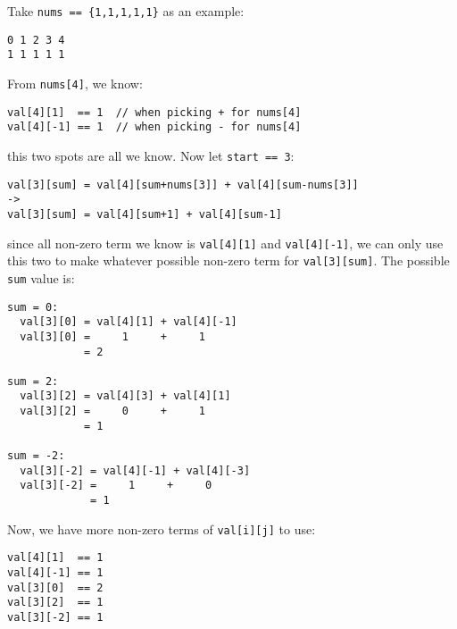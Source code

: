 \documentclass[11pt]{article}
\begin{document}
Take \texttt{nums == \{1,1,1,1,1\}} as an example:
\begin{Verbatim}[frame=single]
0 1 2 3 4
1 1 1 1 1
\end{Verbatim}
From \texttt{nums[4]}, we know:
\begin{Verbatim}[frame=single]
val[4][1]  == 1  // when picking + for nums[4]
val[4][-1] == 1  // when picking - for nums[4]
\end{Verbatim}
this two spots are all we know. Now let \texttt{start == 3}:
\begin{Verbatim}[frame=single]
val[3][sum] = val[4][sum+nums[3]] + val[4][sum-nums[3]]
->
val[3][sum] = val[4][sum+1] + val[4][sum-1]
\end{Verbatim}
since all non-zero term we know is \texttt{val[4][1]} and \texttt{val[4][-1]}, we can only use this two to make whatever possible non-zero term for \texttt{val[3][sum]}. The possible \texttt{sum} value is:
\begin{Verbatim}[frame=single]
sum = 0:
  val[3][0] = val[4][1] + val[4][-1]
  val[3][0] =     1     +     1
            = 2

sum = 2:
  val[3][2] = val[4][3] + val[4][1]
  val[3][2] =     0     +     1
            = 1

sum = -2:
  val[3][-2] = val[4][-1] + val[4][-3]
  val[3][-2] =     1     +     0
             = 1            
\end{Verbatim}

Now, we have more non-zero terms of \texttt{val[i][j]} to use:
\begin{Verbatim}[frame=single]
val[4][1]  == 1
val[4][-1] == 1
val[3][0]  == 2
val[3][2]  == 1
val[3][-2] == 1
\end{Verbatim}
\end{document}
